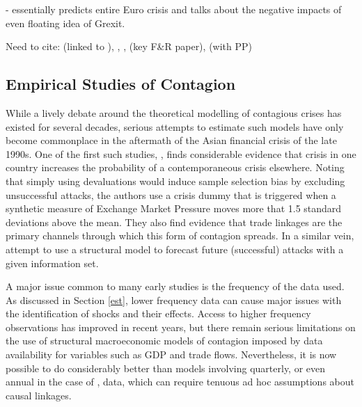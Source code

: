 \documentclass[../base.tex]{subfiles}
\begin{document}
\cite{obstfeld1997destabilizing} - essentially predicts entire Euro crisis and talks about the negative impacts of even floating idea of Grexit.





Need to cite: \cite{brutti2012transmission} (linked to \cite{romer1989does}), \cite{forbes2000contagion}, \cite{forbes2001measuring}, \cite{forbes2002no} (key F\&R paper), \cite{metiu2012sovereign} (with PP)


\subsection{Empirical Studies of Contagion}

While a lively debate around the theoretical modelling of contagious crises has existed for several decades, serious attempts to estimate such models have only become commonplace in the aftermath of the Asian financial crisis of the late 1990s. One of the first such studies, \cite{eichengreen1996contagious}, finds considerable evidence that crisis in one country increases the probability of a contemporaneous crisis elsewhere. Noting that simply using devaluations would induce sample selection bias by excluding unsuccessful attacks, the authors use a crisis dummy that is triggered when a synthetic measure of Exchange Market Pressure moves more that 1.5 standard deviations above the mean. They also find evidence that trade linkages are the primary channels through which this form of contagion spreads. In a similar vein, \cite{esquivel1998explaining} attempt to use a structural model to forecast future (successful) attacks with a given information set.

A major issue common to many early studies is the frequency of the data used. As discussed in Section \ref{est}, lower frequency data can cause major issues with the identification of shocks and their effects. Access to higher frequency observations has improved in recent years, but there remain serious limitations on the use of structural macroeconomic models of contagion imposed by data availability for variables such as GDP and trade flows. Nevertheless, it is now possible to do considerably better than models involving quarterly, or even annual in the case of \cite{esquivel1998explaining}, data, which can require tenuous ad hoc assumptions about causal linkages.
\end{document}
